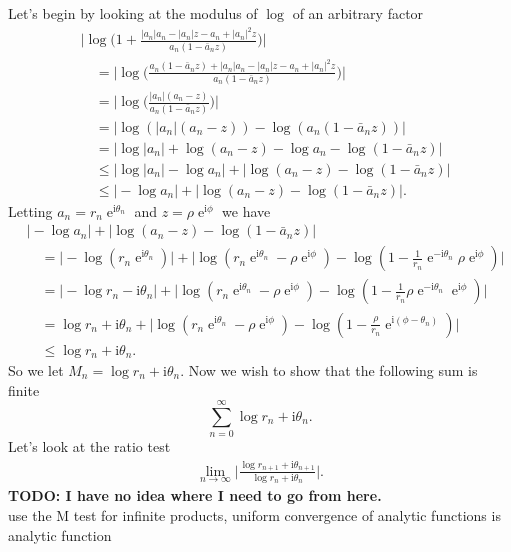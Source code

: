 \documentclass[10pt]{amsart}
\newcommand{\I}{\mathrm{i}}
\DeclareMathOperator{\E}{e}
\theoremstyle{nonumberplain}
\begin{document}
\begin{enumerate}[label={\bf {\arabic*}:}]
\begin{itemize}
\noindent
Let's begin by looking at the modulus of $\log$ of an arbitrary factor
\begin{align*}
& \Bigg|\log \bigg( 1 + \frac{|a_n| a_n - |a_n|z - a_n + |a_n|^2 z}{a_n( 1 - \bar a_n z)}\bigg) \Bigg| \\
	&\quad = \Bigg|\log \bigg(\frac{a_n( 1 - \bar a_n z) + |a_n| a_n - |a_n|z - a_n + |a_n|^2 z}{a_n( 1 - \bar a_n z)}\bigg) \Bigg| \\
	&\quad = \Bigg|\log \bigg( \frac{|a_n| (a_n - z)}{a_n( 1 - \bar a_n z)}\bigg) \Bigg| \\
	&\quad = \big|\log ( |a_n| (a_n - z)) - \log(a_n( 1 - \bar a_n z)) \big| \\
	&\quad= \big|\log |a_n| + \log (a_n - z) - \log a_n - \log( 1 - \bar a_n z) \big| \\
	&\quad \leq \big|\log |a_n| - \log a_n \big| + \big| \log (a_n - z) - \log( 1 - \bar a_n z) \big| \\
	&\quad \leq \big| - \log a_n \big| + \big| \log (a_n - z) - \log( 1 - \bar a_n z) \big|.
\end{align*}
Letting $a_n = r_n\E^{\I\theta_n}$ and $z = \rho \E^{\I\phi}$ we have
\begin{align*}
& \big| - \log a_n \big| + \big| \log (a_n - z) - \log( 1 - \bar a_n z) \big| \\
	& \quad = \big| - \log \left(r_n\E^{\I\theta_n}\right) \big| + \big| \log (r_n\E^{\I\theta_n} - \rho \E^{\I\phi}) - \log( 1 - \frac 1 {r_n} \E^{-\I\theta_n} \rho \E^{\I\phi}) \big| \\
	& \quad = \big| - \log r_n - \I\theta_n \big| + \big| \log (r_n\E^{\I\theta_n} - \rho \E^{\I\phi}) - \log( 1 - \frac 1 {r_n} \rho \E^{-\I\theta_n} \E^{\I\phi}) \big| \\
	& \quad = \log r_n + \I\theta_n + \big| \log (r_n\E^{\I\theta_n} - \rho \E^{\I\phi}) - \log( 1 - \frac \rho {r_n} \E^{\I (\phi - \theta_n)}) \big| \\
	& \quad \leq \log r_n + \I\theta_n.
\end{align*}
So we let $M_n = \log r_n + \I\theta_n$.
Now we wish to show that the following sum is finite
$$\sum_{n = 0}^\infty \log r_n + \I\theta_n.$$
Let's look at the ratio test
\begin{align*}
\lim_{n\rightarrow\infty} \Bigg| \frac {\log r_{n + 1} + \I\theta_{n + 1}}{\log r_n + \I\theta_n} \Bigg|.
\end{align*}
\textbf{TODO: I have no idea where I need to go from here.} \\
use the M test for infinite products, uniform convergence of analytic functions is analytic function \\
  

\end{itemize}
\end{enumerate}
\end{document}
